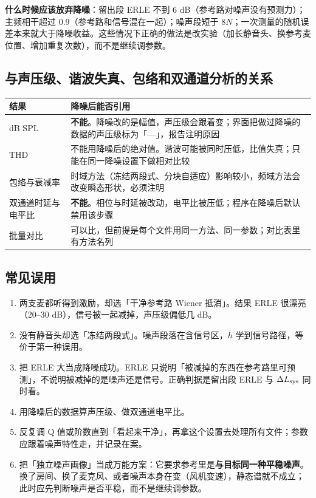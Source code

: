\documentclass[UTF8,a4paper,12pt,scheme=chinese]{ctexart}
\begin{document}
\textbf{什么时候应该放弃降噪}：留出段 ERLE 不到 6 dB（参考路对噪声没有预测力）；主频相干超过 0.9（参考路和信号混在一起）；噪声段短于 $8N$；一次测量的随机误差本来就大于降噪收益。这些情况下正确的做法是改实验（加长静音头、换参考麦位置、增加重复次数），而不是继续调参数。

\subsection{与声压级、谐波失真、包络和双通道分析的关系}

\begin{longtable}{@{}p{}p{}@{}}
\toprule
结果 & 降噪后能否引用 \\
\midrule
\endhead
dB SPL & \textbf{不能}。降噪改的是幅值，声压级会跟着变；界面把做过降噪的数据的声压级标为「—」，报告注明原因 \\
THD & 不能用降噪后的绝对值。谐波可能被同时压低，比值失真；只能在同一降噪设置下做相对比较 \\
包络与衰减率 & 时域方法（冻结两段式、分块自适应）影响较小，频域方法会改变瞬态形状，必须注明 \\
双通道时延与电平比 & \textbf{不能}。相位与时延被改动，电平比被压低；程序在降噪后默认禁用该步骤 \\
批量对比 & 可以比，但前提是每个文件用同一方法、同一参数；对比表里有方法名列 \\
\bottomrule
\end{longtable}

\subsection{常见误用}

\begin{enumerate}[leftmargin=2em]
  \item 两支麦都听得到激励，却选「干净参考路 Wiener 抵消」。结果 ERLE 很漂亮（20--30 dB），信号被一起减掉，声压级偏低几 dB。
  \item 没有静音头却选「冻结两段式」。噪声段落在含信号区，$h$ 学到信号路径，等价于第一种误用。
  \item 把 ERLE 大当成降噪成功。ERLE 只说明「被减掉的东西在参考路里可预测」，不说明被减掉的是噪声还是信号。正确判据是留出段 ERLE 与 $\Delta L_{\rm sys}$ 同时看。
  \item 用降噪后的数据算声压级、做双通道电平比。
  \item 反复调 Q 值或阶数直到「看起来干净」，再拿这个设置去处理所有文件；参数应跟着噪声特性走，并记录在案。
  \item 把「独立噪声画像」当成万能方案：它要求参考里是\textbf{与目标同一种平稳噪声}。换了房间、换了麦克风、或者噪声本身在变（风机变速），静态谱就不成立；此时应先判断噪声是否平稳，而不是继续调参数。
\end{enumerate}
\end{document}
